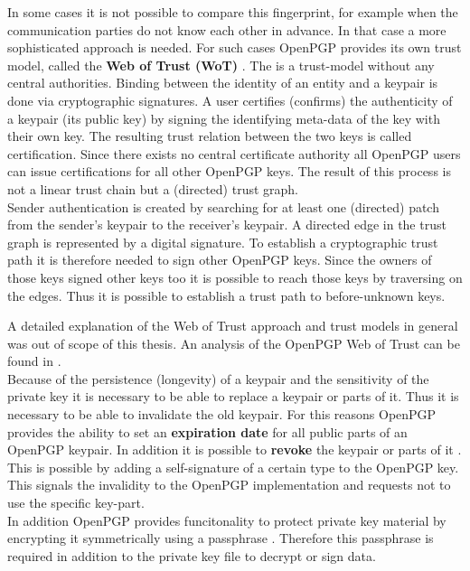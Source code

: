 In some cases it is not possible to compare this fingerprint, for example when the communication parties do not know each other in advance. In that case a more sophisticated approach is needed. For such cases OpenPGP provides its own trust model, called the \textbf{Web of Trust (WoT)} \cite{PGP2manual}. The  is a trust-model without any central authorities. Binding between the identity of an entity and a keypair is done via cryptographic signatures. A user certifies (confirms) the authenticity of a keypair (its public key) by signing the identifying meta-data of the key with their own key. The resulting trust relation between the two keys is called certification. Since there exists no central certificate authority all OpenPGP users can issue certifications for all other OpenPGP keys. The result of this process is not a linear trust chain but a (directed) trust graph. \\

Sender authentication is created by searching for at least one (directed) patch from the sender's keypair to the receiver's keypair. A directed edge in the trust graph is represented by a digital signature. To establish a cryptographic trust path it is therefore needed to sign other OpenPGP keys. Since the owners of those keys signed other keys too it is possible to reach those keys by traversing on the edges. Thus it is possible to establish a trust path to before-unknown keys.

A detailed explanation of the Web of Trust approach and trust models in general was out of scope of this thesis. An analysis of the OpenPGP Web of Trust can be found in \cite{Ulrich2011}. \\


Because of the persistence (longevity) of a keypair and the sensitivity of the private key it is necessary to be able to replace a keypair or parts of it. Thus it is necessary to be able to invalidate the old keypair. For this reasons OpenPGP provides the ability to set an \textbf{expiration date} for all public parts of an OpenPGP keypair. In addition it is possible to \textbf{revoke} the keypair or parts of it \cite[section 5.2]{RFC4880}. This is possible by adding a self-signature of a certain type to the OpenPGP key. This signals the invalidity to the OpenPGP implementation and requests not to use the specific key-part. \\

In addition OpenPGP provides funcitonality to protect private key material by encrypting it symmetrically using a passphrase \cite[section 3.7]{RFC4880}. Therefore this passphrase is required in addition to the private key file to decrypt or sign data.

